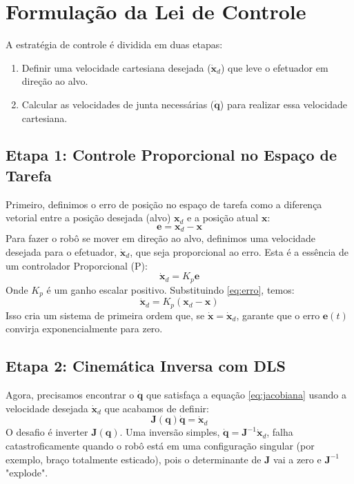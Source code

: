 \documentclass[a4paper, 12pt]{article}
\begin{document}
\section{Formulação da Lei de Controle}
A estratégia de controle é dividida em duas etapas:
\begin{enumerate}
    \item Definir uma velocidade cartesiana desejada ($\dot{\mathbf{x}}_d$) que leve o efetuador em direção ao alvo.
    \item Calcular as velocidades de junta necessárias ($\dot{\mathbf{q}}$) para realizar essa velocidade cartesiana.
\end{enumerate}

\subsection{Etapa 1: Controle Proporcional no Espaço de Tarefa}
Primeiro, definimos o erro de posição no espaço de tarefa como a diferença vetorial entre a posição desejada (alvo) $\mathbf{x}_d$ e a posição atual $\mathbf{x}$:
\begin{equation}
\mathbf{e} = \mathbf{x}_d - \mathbf{x}
\label{eq:erro}
\end{equation}
Para fazer o robô se mover em direção ao alvo, definimos uma velocidade desejada para o efetuador, $\dot{\mathbf{x}}_d$, que seja proporcional ao erro. Esta é a essência de um controlador Proporcional (P):
\begin{equation}
\dot{\mathbf{x}}_d = K_p \mathbf{e}
\label{eq:p_control}
\end{equation}
Onde $K_p$ é um ganho escalar positivo. Substituindo \eqref{eq:erro}, temos:
\[
\dot{\mathbf{x}}_d = K_p (\mathbf{x}_d - \mathbf{x})
\]
Isso cria um sistema de primeira ordem que, se $\dot{\mathbf{x}} = \dot{\mathbf{x}}_d$, garante que o erro $\mathbf{e}(t)$ convirja exponencialmente para zero.

\subsection{Etapa 2: Cinemática Inversa com DLS}
Agora, precisamos encontrar o $\dot{\mathbf{q}}$ que satisfaça a equação \eqref{eq:jacobiana} usando a velocidade desejada $\dot{\mathbf{x}}_d$ que acabamos de definir:
\[
\mathbf{J}(\mathbf{q}) \dot{\mathbf{q}} = \dot{\mathbf{x}}_d
\]
O desafio é inverter $\mathbf{J}(\mathbf{q})$. Uma inversão simples, $\dot{\mathbf{q}} = \mathbf{J}^{-1} \dot{\mathbf{x}}_d$, falha catastroficamente quando o robô está em uma configuração singular (por exemplo, braço totalmente esticado), pois o determinante de $\mathbf{J}$ vai a zero e $\mathbf{J}^{-1}$ "explode".
\end{document}
